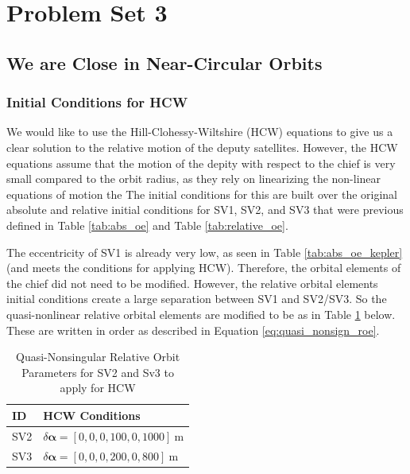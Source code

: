 \section{Problem Set 3}
\subsection{We are Close in Near-Circular Orbits}

\subsubsection{Initial Conditions for HCW}

We would like to use the Hill-Clohessy-Wiltshire (HCW) equations to give us a clear solution to the relative motion of the deputy satellites. However, the HCW equations assume that the motion of the depity with respect to the chief is very small compared to the orbit radius, as they rely on linearizing the non-linear equations of motion the The initial conditions for this are built over the original absolute and relative initial conditions for SV1, SV2, and SV3 that were previous defined in Table \ref{tab:abs_oe} and Table \ref{tab:relative_oe}.

The eccentricity of SV1 is already very low, as seen in Table \ref{tab:abs_oe_kepler} (and meets the conditions for applying HCW). Therefore, the orbital elements of the chief did not need to be modified. However, the relative orbital elements initial conditions create a large separation between SV1 and SV2/SV3. So the quasi-nonlinear relative orbital elements are modified to be as in Table \ref{tab:relative_oe_hcw} below. These are written in order as described in Equation \ref{eq:quasi_nonsign_roe}.

\begin{table}[h!]
\centering
\begin{tabular}{ll}
\toprule
\textbf{ID} & \textbf{HCW Conditions} \\
\midrule
SV2 & $\delta\boldsymbol{\alpha} = [0, 0, 0, 100, 0, 1000]~\text{m}$ \\
SV3 & $\delta\boldsymbol{\alpha} = [0, 0, 0, 200, 0, 800]~\text{m}$ \\
\bottomrule
\end{tabular}
\caption{Quasi-Nonsingular Relative Orbit Parameters for SV2 and Sv3 to apply for HCW}
\label{tab:relative_oe_hcw}
\end{table}


